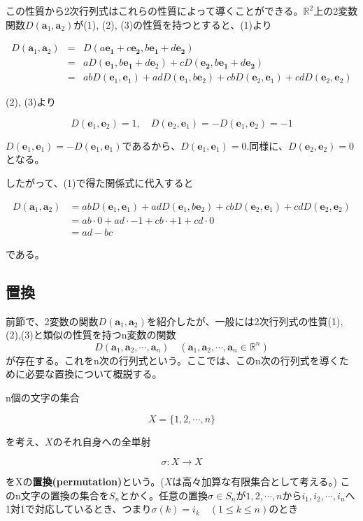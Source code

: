 \documentclass[dvipdfmx,autodetect-engine]{jsarticle}
\theoremstyle{definition}
\newcommand{\vecSpace}[1]{\mathbb{R}^{#1}}
\begin{document}
この性質から2次行列式はこれらの性質によって導くことができる。$\vecSpace{2}$上の2変数関数$D(\bm{a}_1, \bm{a}_2)$が(1), (2), (3)の性質を持つとすると、(1)より

\begin{eqnarray*}
D(\bm{a}_1, \bm{a}_2) &= &D(a\bm{e_1} + c\bm{e_2}, b\bm{e_1} + d\bm{e_2}) \\
&= &aD(\bm{e_1}, b\bm{e_1} + d \bm{e}_2) + cD(\bm{e_2}, b\bm{e_1} + d\bm{e_2}) \\
&= &abD(\bm{e}_1, \bm{e}_1) + adD(\bm{e}_1, b\bm{e}_2) + cbD(\bm{e}_2, \bm{e}_1) + cdD(\bm{e}_2, \bm{e}_2)
\end{eqnarray*}

(2), (3)より

$$
D(\bm{e}_1, \bm{e}_2) = 1, \quad D(\bm{e}_2, \bm{e}_1) = -D(\bm{e}_1, \bm{e}_2) = -1
$$

$D(\bm{e}_1, \bm{e}_1) = -D(\bm{e}_1, \bm{e}_1)$であるから、$D(\bm{e}_1, \bm{e}_1) = 0$.同様に、$D(\bm{e}_2, \bm{e}_2) = 0$となる。

したがって、(1)で得た関係式に代入すると

\begin{equation*}
\begin{split}
D(\bm{a}_1, \bm{a}_2) &= abD(\bm{e}_1, \bm{e}_1) + adD(\bm{e}_1, b\bm{e}_2) + cbD(\bm{e}_2, \bm{e}_1) + cdD(\bm{e}_2, \bm{e}_2) \\
&= ab \cdot 0 + ad \cdot -1 + cb \cdot + 1 + cd \cdot 0 \\
&= ad - bc
\end{split}
\end{equation*}

である。

\subsection{置換}

前節で、2変数の関数$D(\bm{a}_1, \bm{a}_2)$を紹介したが、一般には2次行列式の性質(1),(2),(3)と類似の性質を持つn変数の関数
$$
D(\bm{a}_1, \bm{a}_2, \cdots, \bm{a}_n) \quad (\bm{a}_1, \bm{a}_2, \cdots, \bm{a}_n \in \vecSpace{n})
$$
が存在する。これをn次の行列式という。ここでは、このn次の行列式を導くために必要な置換について概説する。

n個の文字の集合

$$
X = \{1, 2, \cdots, n\}
$$

を考え、$X$のそれ自身への全単射

$$
\sigma: X \to X
$$

をXの{\bf 置換(permutation)}という。($X$は高々加算な有限集合として考える。)
このn文字の置換の集合を$S_n$とかく。任意の置換$\sigma \in S_n$が$1, 2, \cdots, n$から$i_1, i_2, \cdots, i_n$へ1対1で対応しているとき、つまり$\sigma(k) = i_k \quad (1 \leq k \leq n)$のとき
\end{document}
